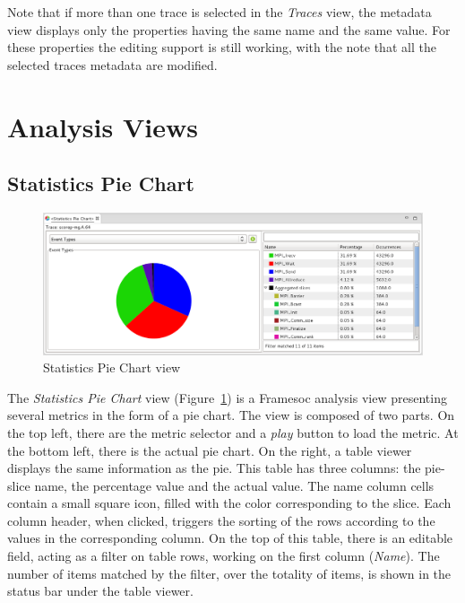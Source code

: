 \documentclass[twoside]{article}
\begin{document}
\begin{sloppypar}
Note that if more than one trace is selected in the \emph{Traces} view, the metadata view displays only the properties having the same name and the same value. 
For these properties the editing support is still working, with the note that all the selected traces metadata are modified.


\section{Analysis Views}
\label{sec:analysis}

\subsection{Statistics Pie Chart}
\label{subsec:pie}

\begin{figure}[h!]
  \centering
    \includegraphics[width=1.0\textwidth]{images/pie_chart.png}
  \caption{Statistics Pie Chart view}
  \label{fig:pie_chart}
\end{figure}

The \emph{Statistics Pie Chart} view (Figure~\ref{fig:pie_chart}) is a Framesoc analysis view presenting several metrics in the form of a pie chart.
The view is composed of two parts.
On the top left, there are the metric selector and a \emph{play} button to load the metric. 
At the bottom left, there is the actual pie chart.
On the right, a table viewer displays the same information as the pie. 
This table has three columns: the pie-slice name, the percentage value and the actual value. 
The name column cells contain a small square icon, filled with the color corresponding to the slice.
Each column header, when clicked, triggers the sorting of the rows according to the values in the corresponding column.
On the top of this table, there is an editable field, acting as a filter on table rows, working on the first column (\emph{Name}).
The number of items matched by the filter, over the totality of items, is shown in the status bar under the table viewer.


\end{sloppypar}
\end{document}

